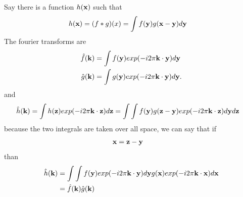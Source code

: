 Say there is a function $h(\textbf{x})$ such that
\begin{align}
  h(\textbf{x}) &= (f\ast g)(x) = \int f(\textbf{y})g(\textbf{x}-\textbf{y})d\textbf{y}
\end{align}
The fourier transforms are
\begin{align}
  \hat{f}(\textbf{k}) &= \int f(\textbf{y}) exp(-i2\pi \textbf{k} \cdot \textbf{y})d\textbf{y} \\
  \hat{g}(\textbf{k}) &= \int g(\textbf{y}) exp(-i2\pi \textbf{k} \cdot \textbf{y})d\textbf{y}.
\end{align}
and
\begin{align}
  \hat{h}(\textbf{k}) = \int h(\textbf{z}) exp(-i2\pi \textbf{k} \cdot \textbf{z}) d\textbf{z} &= \int \int f(\textbf{y}) g(\textbf{z}-\textbf{y}) exp(-i2\pi \textbf{k} \cdot \textbf{z}) d\textbf{y} d\textbf{z}
\end{align}
because the two integrals are taken over all space, we can say that if
\begin{align}
\textbf{x} &= \textbf{z} - \textbf{y}
\end{align}
than
\begin{align}
\hat{h}(\textbf{k}) &= \int \int f(\textbf{y}) exp(-i2\pi \textbf{k} \cdot \textbf{y} ) d\textbf{y} g(\textbf{x}) exp(-i2\pi \textbf{k} \cdot \textbf{x}) d\textbf{x} \\
&= \hat{f}(\textbf{k}) \hat{g}(\textbf{k})
\end{align}


